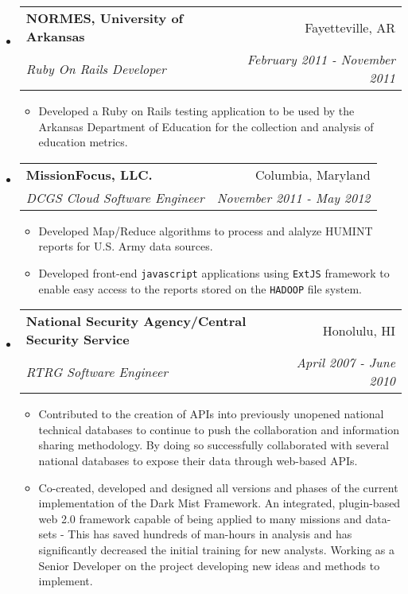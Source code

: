 \documentclass[letterpaper,13pt]{article}
\makeatletter
\newcommand{\resitem}[1]{\item #1 \vspace{-2pt}}
\newcommand{\ressubheading}[4]{

\begin{tabular*}{6.5in}{l@{\cftdotfill{\cftsecdotsep}\extracolsep{\fill}}r}

		\textbf{#1} & #2 \\

		\textit{#3} & \textit{#4} \\

\end{tabular*}\vspace{-4pt}}
\makeatother
\begin{document}
\begin{itemize}
\begin{itemize}
	\end{itemize}
	
\item

	\ressubheading{NORMES, University of Arkansas}{Fayetteville, AR}{Ruby On Rails Developer}{February 2011 - November 2011}

	\begin{itemize}

		\resitem{Developed a Ruby on Rails testing application to be used by the Arkansas Department of Education for the collection and analysis of education metrics.}

	\end{itemize}
	
\item

	\ressubheading{MissionFocus, LLC.}{Columbia, Maryland}{DCGS Cloud Software Engineer}{November 2011 - May 2012}

	\begin{itemize}

		\resitem{Developed Map/Reduce algorithms to process and alalyze HUMINT reports for U.S. Army data sources.}
		
		\resitem{Developed front-end \texttt{javascript} applications using \texttt{ExtJS} framework to enable easy access to the reports stored on the \texttt{HADOOP} file system.}

	\end{itemize}
	
\item

	\ressubheading{National Security Agency/Central Security Service}{Honolulu, HI}{RTRG Software Engineer}{April 2007 - June 2010}

	\begin{itemize}

		\resitem{Contributed to the creation of APIs into previously unopened national technical databases to continue to push the collaboration and information sharing methodology. By doing so successfully collaborated with several national databases to expose their data through web-based APIs.}
		
		\resitem{Co-created, developed and designed all versions and phases of the current implementation of the Dark Mist Framework. An integrated, plugin-based web 2.0 framework capable of being applied to many missions and data-sets - This has saved hundreds of man-hours in analysis and has significantly decreased the initial training for new analysts. Working as a Senior Developer on the project developing new ideas and methods to implement.}


\end{itemize}
\end{itemize}
\end{document}
